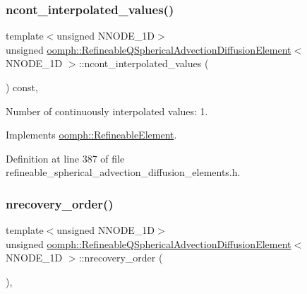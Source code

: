 \subsubsection{\texorpdfstring{ncont\+\_\+interpolated\+\_\+values()}{ncont\_interpolated\_values()}}
{\footnotesize\ttfamily template$<$unsigned N\+N\+O\+D\+E\+\_\+1D$>$ \\
unsigned \hyperlink{classoomph_1_1RefineableQSphericalAdvectionDiffusionElement}{oomph\+::\+Refineable\+Q\+Spherical\+Advection\+Diffusion\+Element}$<$ N\+N\+O\+D\+E\+\_\+1D $>$\+::ncont\+\_\+interpolated\+\_\+values (\begin{DoxyParamCaption}{ }\end{DoxyParamCaption}) const\hspace{0.3cm}{\ttfamily [inline]}, {\ttfamily [virtual]}}



Number of continuously interpolated values\+: 1. 



Implements \hyperlink{classoomph_1_1RefineableElement_a53e171a18c9f43f1db90a6876516a073}{oomph\+::\+Refineable\+Element}.



Definition at line 387 of file refineable\+\_\+spherical\+\_\+advection\+\_\+diffusion\+\_\+elements.\+h.

\mbox{\label{classoomph_1_1RefineableQSphericalAdvectionDiffusionElement_a7ebf5133adf3d34fc30ce9b7c2ee2ef8}} 
\subsubsection{\texorpdfstring{nrecovery\+\_\+order()}{nrecovery\_order()}}
{\footnotesize\ttfamily template$<$unsigned N\+N\+O\+D\+E\+\_\+1D$>$ \\
unsigned \hyperlink{classoomph_1_1RefineableQSphericalAdvectionDiffusionElement}{oomph\+::\+Refineable\+Q\+Spherical\+Advection\+Diffusion\+Element}$<$ N\+N\+O\+D\+E\+\_\+1D $>$\+::nrecovery\+\_\+order (\begin{DoxyParamCaption}{ }\end{DoxyParamCaption})\hspace{0.3cm}{\ttfamily [inline]}, {\ttfamily [virtual]}}



